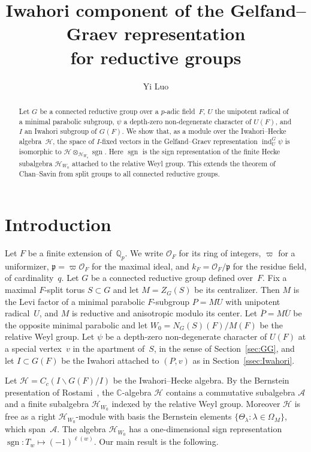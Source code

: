 \documentclass[11pt]{amsart}
\title[Iwahori component of the Gelfand--Graev for reductive groups]{Iwahori component of the Gelfand--Graev representation \\ for reductive groups}
\author{Yi Luo}
\date{}
\theoremstyle{definition}
\theoremstyle{remark}
\DeclareMathOperator{\ind}{ind}
\DeclareMathOperator{\sgn}{sgn}
\newcommand{\CC}{\mathbb{C}}
\newcommand{\HH}{\mathcal{H}}
\newcommand{\AAA}{\mathcal{A}}
\newcommand{\OO}{\mathcal{O}}
\newcommand{\pp}{\mathfrak{p}}
\newcommand{\barr}[1]{\overline{#1}}
\begin{document}
\begin{abstract}
Let $G$ be a connected reductive group over a $p$-adic field~$F$, $U$ the unipotent radical of a minimal parabolic subgroup, $\psi$ a depth-zero non-degenerate character of $U(F)$, and $I$ an Iwahori subgroup of $G(F)$. We show that, as a module over the Iwahori--Hecke algebra~$\HH$, the space of $I$-fixed vectors in the Gelfand--Graev representation $\ind_U^G\psi$ is isomorphic to $\HH \otimes_{\HH_{W_0}} \sgn$. Here $\sgn$ is the sign representation of the finite Hecke subalgebra $\HH_{W_0}$ attached to the relative Weyl group. This extends the theorem of Chan--Savin from split groups to all connected reductive groups.
\end{abstract}

\maketitle


\section{Introduction}

Let $F$ be a finite extension of~$\mathbb{Q}_p$. We write $\OO_F$ for its ring of integers, $\varpi$ for a uniformizer, $\pp = \varpi\OO_F$ for the maximal ideal, and $k_F = \OO_F/\pp$ for the residue field, of cardinality~$q$. Let $G$ be a connected reductive group defined over~$F$. Fix a maximal $F$-split torus $S \subset G$ and let $M = Z_G(S)$ be its centralizer. Then $M$ is the Levi factor of a minimal parabolic $F$-subgroup $P = MU$ with unipotent radical~$U$, and $M$ is reductive and anisotropic modulo its center. Let $\barr{P} = M\barr{U}$ be the opposite minimal parabolic and let $W_0 = N_G(S)(F)/M(F)$ be the relative Weyl group. Let $\psi$ be a depth-zero non-degenerate character of $U(F)$ at a special vertex~$v$ in the apartment of~$S$, in the sense of Section~\ref{sec:GG}, and let $I \subset G(F)$ be the Iwahori attached to $(P,v)$ as in Section~\ref{ssec:Iwahori}.

Let $\HH = C_c(I\backslash G(F)/I)$ be the Iwahori--Hecke algebra. By the Bernstein presentation of Rostami~\cite{Rostami}, the $\CC$-algebra $\HH$ contains a commutative subalgebra $\AAA$ and a finite subalgebra $\HH_{W_0}$ indexed by the relative Weyl group. Moreover $\HH$ is free as a right $\HH_{W_0}$-module with basis the Bernstein elements $\{\Theta_\lambda : \lambda \in \Omega_M\}$, which span~$\AAA$. The algebra $\HH_{W_0}$ has a one-dimensional sign representation $\sgn \colon T_w \mapsto (-1)^{\ell(w)}$. Our main result is the following.
\end{document}
